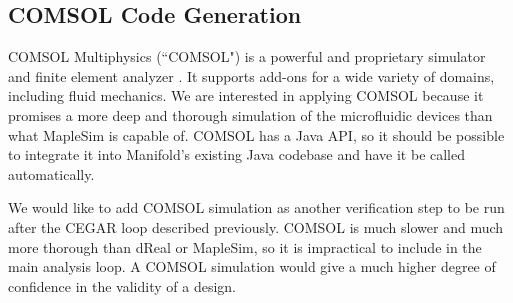\subsection{COMSOL Code Generation}

COMSOL Multiphysics (``COMSOL") \cite{comsol} is a powerful and proprietary simulator and finite element analyzer \cite{fem}.
It supports add-ons for a wide variety of domains, including fluid mechanics.
We are interested in applying COMSOL because it promises a more deep and thorough simulation of the microfluidic devices than what MapleSim is capable of.
COMSOL has a Java API, so it should be possible to integrate it into Manifold's existing Java codebase and have it be called automatically.

We would like to add COMSOL simulation as another verification step to be run after the CEGAR
loop described previously.
COMSOL is much slower and much more thorough than dReal or MapleSim, so it is impractical to include
in the main analysis loop. A COMSOL simulation would give a much higher degree of confidence in the
validity of a design.
